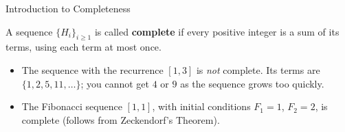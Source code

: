 \documentclass{beamer}
\begin{document}
\begin{frame} {
    Introduction to Completeness}
    \begin{definition}
        A sequence $\{H_i\}_{i \ge 1}$ is called \textbf{complete} if every positive integer is a sum of its terms, using each term at most once.
    \end{definition}
    \medskip
    \begin{itemize}
    \pause
     \item The sequence with the recurrence $[1, 3]$ is \emph{not} complete. Its terms are $\{1,2,5,11,\dots\}$; you cannot get $4$ or $9$ as the sequence grows too quickly.\medskip
    \pause
    \item The Fibonacci sequence $[1,1]$, with initial conditions $F_1 = 1$, $F_2 = 2$, is complete (follows from Zeckendorf's Theorem).
    \end{itemize}
    
    
\end{frame}
\end{document}

